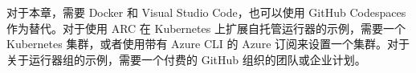 

对于本章，需要 Docker 和 Visual Studio Code，也可以使用 GitHub Codespaces 作为替代。对于使用 ARC 在 Kubernetes 上扩展自托管运行器的示例，需要一个 Kubernetes 集群，或者使用带有 Azure CLI 的 Azure 订阅来设置一个集群。对于关于运行器组的示例，需要一个付费的 GitHub 组织的团队或企业计划。





